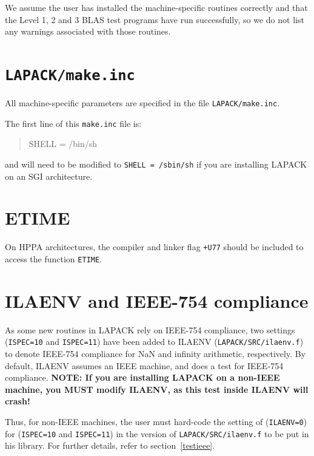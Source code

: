 \documentclass[11pt]{report}
\begin{document}
We assume the user has installed the machine-specific routines
correctly and that the Level 1, 2 and 3 BLAS test programs have run
successfully, so we do not list any warnings associated with those
routines.

\section{\texttt{LAPACK/make.inc}}

All machine-specific
parameters are specified in the file \texttt{LAPACK/make.inc}.

The first line of this \texttt{make.inc} file is:
\begin{quote}
SHELL = /bin/sh
\end{quote}
and will need to be modified to \texttt{SHELL = /sbin/sh} if you are
installing LAPACK on an SGI architecture.

\section{ETIME}

On HPPA architectures,
the compiler and linker flag \texttt{+U77} should be included to access
the function \texttt{ETIME}.

\section{ILAENV and IEEE-754 compliance}

%

As some new routines in LAPACK rely on IEEE-754 compliance,
two settings (\texttt{ISPEC=10} and \texttt{ISPEC=11}) have been added to ILAENV
(\texttt{LAPACK/SRC/ilaenv.f}) to denote IEEE-754 compliance for NaN and
infinity arithmetic, respectively.  By default, ILAENV assumes an IEEE
machine, and does a test for IEEE-754 compliance.  \textbf{NOTE:  If you
are installing LAPACK on a non-IEEE machine, you MUST modify ILAENV,
as this test inside ILAENV will crash!}

Thus, for non-IEEE machines, the user must hard-code the setting of
(\texttt{ILAENV=0}) for (\texttt{ISPEC=10} and \texttt{ISPEC=11}) in the version
of \texttt{LAPACK/SRC/ilaenv.f} to be put in
his library.  For further details, refer to section~\ref{testieee}.
\end{document}
